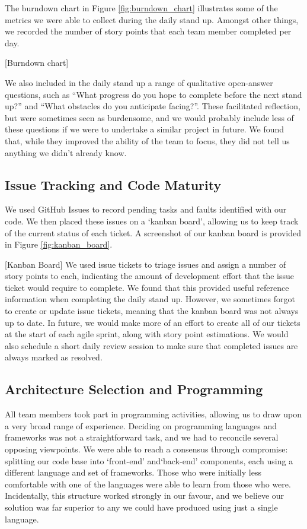 The burndown chart in Figure \ref{fig:burndown_chart} illustrates some of the metrics we were able to collect during the daily stand up. Amongst other things, we recorded the number of story points that each team member completed per day. 

[Burndown chart]

We also included in the daily stand up a range of qualitative open-answer questions, such as “What progress do you hope to complete before the next stand up?” and “What obstacles do you anticipate facing?”. These facilitated reflection, but were sometimes seen as burdensome, and we would probably include less of these questions if we were to undertake a similar project in future. We found that, while they improved the ability of the team to focus, they did not tell us anything we didn’t already know.

\subsection{Issue Tracking and Code Maturity}
\label{sec:issuetracking}
We used GitHub Issues to record pending tasks and faults identified with our code. We then placed these issues on a `kanban board’, allowing us to keep track of the current status of each ticket. A screenshot of our kanban board is provided in Figure \ref{fig:kanban_board}.

[Kanban Board]
We used issue tickets to triage issues and assign a number of story points to each, indicating the amount of development effort that the issue ticket would require to complete. We found that this provided useful reference information when completing the daily stand up. However, we sometimes forgot to create or update issue tickets, meaning that the kanban board was not always up to date. In future, we would make more of an effort to create all of our tickets at the start of each agile sprint, along with story point estimations. We would also schedule a short daily review session to make sure that completed issues are always marked as resolved.


\subsection{Architecture Selection and Programming}
All team members took part in programming activities, allowing us to draw upon a very broad range of experience. Deciding on programming languages and frameworks was not a straightforward task, and we had to reconcile several opposing viewpoints. We were able to reach a consensus through compromise: splitting our code base into `front-end’ and`back-end’ components, each using a different language and set of frameworks. Those who were initially less comfortable with one of the languages were able to learn from those who were. Incidentally, this structure worked strongly in our favour, and we believe our solution was far superior to any we could have produced using just a single language.

